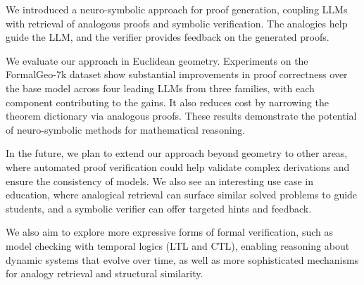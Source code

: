 


We introduced a neuro-symbolic approach for proof generation, coupling LLMs with retrieval of analogous proofs and symbolic verification. The analogies help guide the LLM, and the verifier provides feedback on the generated proofs.

We evaluate our approach in Euclidean geometry. Experiments on the FormalGeo-7k dataset show substantial improvements in proof correctness over the base model across four leading LLMs from three families, with each component contributing to the gains. It also reduces cost by narrowing the theorem dictionary via analogous proofs.
These results demonstrate the potential of neuro-symbolic methods for mathematical reasoning.






In the future, we plan to extend our approach beyond geometry to other %
areas, where automated proof verification could help validate complex derivations and ensure the consistency of models. We also see an interesting use case in education, where analogical retrieval can surface similar solved problems to guide students, and a symbolic verifier can offer targeted hints and feedback. %

We also aim to explore more expressive forms of formal verification, such as model checking with temporal logics (LTL and CTL), enabling reasoning about dynamic systems that evolve over time, as well as more sophisticated mechanisms for analogy retrieval and %
structural similarity.



